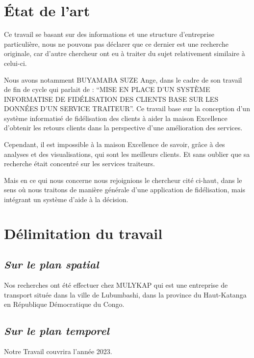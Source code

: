 \documentclass[a4paper,12pt,oneside]{book}
\begin{document}
        \section[Etat de l'art]{État de l’art}
        Ce travail se basant sur des informations et une structure d’entreprise particulière, nous ne
        pouvons pas déclarer que ce dernier est une recherche originale, car d’autre chercheur ont eu
        à traiter du sujet relativement similaire à celui-ci.
        \newline

        Nous avons notamment BUYAMABA SUZE Ange, dans le cadre de son travail de fin de cycle
        qui parlait de : \enquote{MISE EN PLACE D’UN SYSTÈME INFORMATISE DE FIDÉLISATION DES CLIENTS BASE SUR LES
        DONNÉES D’UN SERVICE TRAITEUR}. Ce travail base sur la conception d’un système informatisé de fidélisation des clients
        à aider la maison Excellence d’obtenir les retours clients dans la perspective d’une amélioration des services.\cite{Buyamba2017}
        \newline

        Cependant, il est impossible à la maison Excellence de savoir, grâce à des analyses et des visualisations, qui
        sont les meilleurs clients. Et sans oublier que sa recherche était concentré sur les services traiteurs. 
        \newline

        Mais en ce qui nous concerne nous rejoignions le chercheur cité ci-haut, dans le sens où nous traitons de manière
        générale d’une application de fidélisation, mais intégrant un système d’aide à la décision.
        \section[Délimitation du travail]{Délimitation du travail}
            \subsection[Sur le plan spatial]{\textit{Sur le plan spatial}}
            Nos recherches ont été effectuer chez MULYKAP qui est une entreprise de transport
            située dans la ville de Lubumbashi, dans la province du Haut-Katanga en République Démocratique du Congo.
            \subsection[Sur le plan temporel]{\textit{Sur le plan temporel}}
            Notre Travail couvrira l’année 2023.
\end{document}

